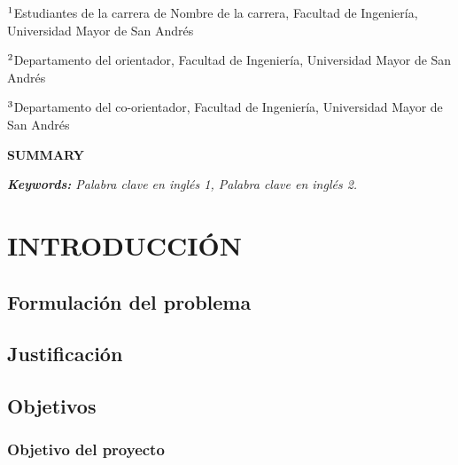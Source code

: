 \documentclass[11pt,oneside,a4paper]{book}
\begin{document}
$^{\textnormal{1}}$Estudiantes de la carrera de Nombre de la carrera, Facultad de Ingeniería, Universidad Mayor de San Andrés

$^{\textnormal{2}}$Departamento del orientador, Facultad de Ingeniería, Universidad Mayor de San Andrés

$^{\textnormal{3}}$Departamento del co-orientador, Facultad de Ingeniería, Universidad Mayor de San Andrés


\begin{center}
    \textbf{SUMMARY}
\end{center}
\noindent 
\lipsum[1]


\textit{\textbf{Keywords:} Palabra clave en inglés 1, Palabra clave en inglés 2.}


\justify

\large
\clearpage
{}
\tableofcontents
\pagebreak

\let\origaddvspace\addvspace
 \renewcommand{\addvspace}[1]{}
 \listoftables
 \pagebreak
 \listoffigures
 \renewcommand{\addvspace}[1]{\origaddvspace{#1}}
\pagebreak

\cleardoublepage
{}
\listofappendix
\pagebreak
\cleardoublepage
{}
\printnomenclature[3cm]



\pagebreak
{}

\normalsize

\chapter[CAPÍTULO I - INTRODUCCIÓN]{INTRODUCCIÓN}
\lipsum[1]

\newpage
\section{Formulación del problema}
\lipsum[1]

\newpage
\section{Justificación}
\lipsum[1]

\newpage
\section{Objetivos}
\subsection{Objetivo del proyecto}
\lipsum[1]
\end{document}
